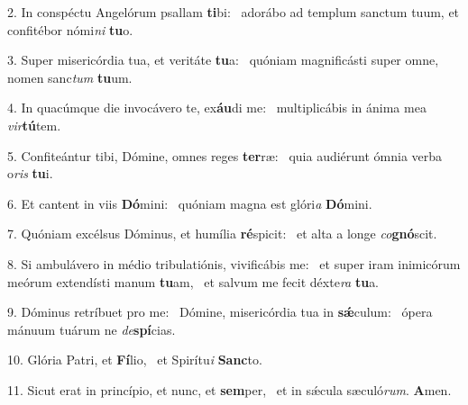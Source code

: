 2. In conspéctu Angelórum psallam \textbf{ti}bi: \ast\  adorábo ad templum sanctum tuum, et confitébor nómi\textit{ni} \textbf{tu}o.\

3. Super misericórdia tua, et veritáte \textbf{tu}a: \ast\  quóniam magnificásti super omne, nomen sanc\textit{tum} \textbf{tu}um.\

4. In quacúmque die invocávero te, ex\textbf{áu}di me: \ast\  multiplicábis in ánima mea \textit{vir}\textbf{tú}tem.\

5. Confiteántur tibi, Dómine, omnes reges \textbf{ter}ræ: \ast\  quia audiérunt ómnia verba o\textit{ris} \textbf{tu}i.\

6. Et cantent in viis \textbf{Dó}mini: \ast\  quóniam magna est glóri\textit{a} \textbf{Dó}mini.\

7. Quóniam excélsus Dóminus, et humília \textbf{ré}spicit: \ast\  et alta a longe \textit{co}\textbf{gnó}scit.\

8. Si ambulávero in médio tribulatiónis, vivificábis me: \dag\  et super iram inimicórum meórum extendísti manum \textbf{tu}am, \ast\  et salvum me fecit déxte\textit{ra} \textbf{tu}a.\

9. Dóminus retríbuet pro me: \dag\  Dómine, misericórdia tua in \textbf{sǽ}culum: \ast\  ópera mánuum tuárum ne \textit{de}\textbf{spí}cias.\

10. Glória Patri, et \textbf{Fí}lio, \ast\  et Spirítu\textit{i} \textbf{Sanc}to.\

11. Sicut erat in princípio, et nunc, et \textbf{sem}per, \ast\  et in sǽcula sæculó\textit{rum}. \textbf{A}men.\

